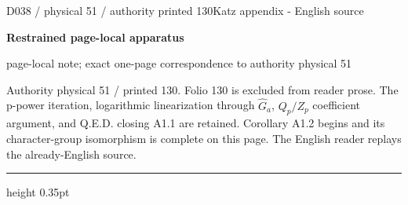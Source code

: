 \documentclass[9pt]{article}
\newcommand{\CanonText}[1]{\par{\fontsize{8.0}{9.35}\selectfont\RaggedRight #1\par}\vspace{2.2pt}}
\newcommand{\LayerTitle}{Restrained page-local apparatus}
\begin{document}
\noindent\begin{minipage}[t][\dimexpr\textheight-5pt\relax][t]{\textwidth}
{\sffamily\fontsize{7.3}{8.2}\selectfont\color{Quiet} D038 / physical 51 / authority printed 130\hfill Katz appendix - English source}
\par{}\vspace{4.5pt}
{\sffamily\fontsize{10.4}{11.6}\selectfont\bfseries\color{Accent} \LayerTitle}
\par{\sffamily\fontsize{6.7}{7.7}\selectfont\color{Quiet} page-local note; exact one-page correspondence to authority physical 51}
\vspace{5pt}
\CanonText{Authority physical 51 / printed 130. Folio 130 is excluded from reader prose. The p-power iteration, logarithmic linearization through \(\widehat{G}_{a}\), \(Q_{p}/Z_{p}\) coefficient argument, and Q.E.D. closing A1.1 are retained. Corollary A1.2 begins and its character-group isomorphism is complete on this page. The English reader replays the already-English source.}
\vfill
{\color{Accent}\hrule height 0.35pt}\vspace{3pt}
\end{minipage}
\newpage
\end{document}
